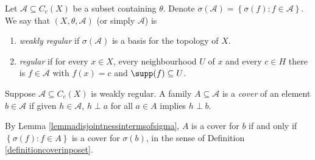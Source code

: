 \begin{definition}\label{definitionregularperpp}
Let $\mathcal{A}\subseteq C_c(X)$ be a subset containing $\theta$. Denote $\sigma(\mathcal{A})=\left\{\sigma(f):f\in\mathcal{A}\right\}$. We say that $(X,\theta,\mathcal{A})$ (or simply $\mathcal{A}$) is
\begin{enumerate}
\item \emph{weakly regular} if $\sigma(\mathcal{A})$ is a basis for the topology of $X$.
\item \emph{regular} if for every $x\in X$, every neighbourhood $U$ of $x$ and every $c\in H$ there is $f\in\mathcal{A}$ with $f(x)=c$ and $\supp(f)\subseteq U$.
\end{enumerate}
\end{definition}

\begin{definition}\label{definitiondisjointcover}
Suppose $\mathcal{A}\subseteq C_c(X)$ is weakly regular. A family $A\subseteq\mathcal{A}$ is a \emph{cover} of an element $b\in\mathcal{A}$ if given $h\in\mathcal{A}$, $h\perp a$ for all $a\in A$ implies $h\perp b$.
\end{definition}

By Lemma \ref{lemmadisjointnessintermsofsigma}, $A$ is a cover for $b$ if and only if $\left\{\sigma(f):f\in A\right\}$ is a cover for $\sigma(b)$, in the sense of Definition \ref{definitioncoverinposet}.

